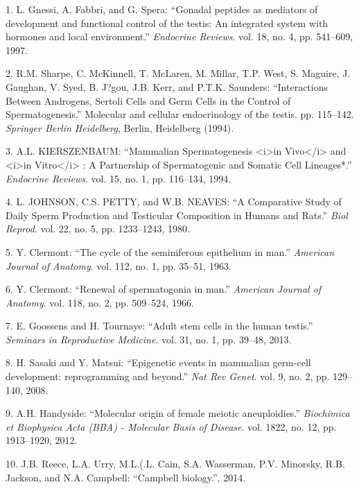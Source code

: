 \documentclass[12pt,a4paper,twoside]{ugathesis}
\theoremstyle{definition}
\theoremstyle{definition}
\theoremstyle{definition}
\theoremstyle{remark}
\begin{document}
\hypertarget{refs}{}
\hypertarget{ref-Gnessi1997}{}
1. L. Gnessi, A. Fabbri, and G. Spera: ``Gonadal peptides as mediators
of development and functional control of the testis: An integrated
system with hormones and local environment.'' \emph{Endocrine Reviews}.
vol. 18, no. 4, pp. 541--609, 1997.

\hypertarget{ref-Sharpe1994}{}
2. R.M. Sharpe, C. McKinnell, T. McLaren, M. Millar, T.P. West, S.
Maguire, J. Gaughan, V. Syed, B. J?gou, J.B. Kerr, and P.T.K. Saunders:
``Interactions Between Androgens, Sertoli Cells and Germ Cells in the
Control of Spermatogenesis.'' Molecular and cellular endocrinology of
the testis. pp. 115--142. \emph{Springer Berlin Heidelberg}, Berlin,
Heidelberg (1994).

\hypertarget{ref-KIERSZENBAUM1994}{}
3. A.L. KIERSZENBAUM: ``Mammalian Spermatogenesis
\textless{}i\textgreater{}in Vivo\textless{}/i\textgreater{} and
\textless{}i\textgreater{}in Vitro\textless{}/i\textgreater{} : A
Partnership of Spermatogenic and Somatic Cell Lineages*.''
\emph{Endocrine Reviews}. vol. 15, no. 1, pp. 116--134, 1994.

\hypertarget{ref-Johnson1980}{}
4. L. JOHNSON, C.S. PETTY, and W.B. NEAVES: ``A Comparative Study of
Daily Sperm Production and Testicular Composition in Humans and Rats.''
\emph{Biol Reprod}. vol. 22, no. 5, pp. 1233--1243, 1980.

\hypertarget{ref-Clermont1963}{}
5. Y. Clermont: ``The cycle of the seminiferous epithelium in man.''
\emph{American Journal of Anatomy}. vol. 112, no. 1, pp. 35--51, 1963.

\hypertarget{ref-Clermont1966}{}
6. Y. Clermont: ``Renewal of spermatogonia in man.'' \emph{American
Journal of Anatomy}. vol. 118, no. 2, pp. 509--524, 1966.

\hypertarget{ref-Goossens2013}{}
7. E. Goossens and H. Tournaye: ``Adult stem cells in the human
testis.'' \emph{Seminars in Reproductive Medicine}. vol. 31, no. 1, pp.
39--48, 2013.

\hypertarget{ref-Sasaki2008}{}
8. H. Sasaki and Y. Matsui: ``Epigenetic events in mammalian germ-cell
development: reprogramming and beyond.'' \emph{Nat Rev Genet}. vol. 9,
no. 2, pp. 129--140, 2008.

\hypertarget{ref-Handyside2012}{}
9. A.H. Handyside: ``Molecular origin of female meiotic aneuploidies.''
\emph{Biochimica et Biophysica Acta (BBA) - Molecular Basis of Disease}.
vol. 1822, no. 12, pp. 1913--1920, 2012.

\hypertarget{ref-Reece2014}{}
10. J.B. Reece, L.A. Urry, M.L.(.L. Cain, S.A. Wasserman, P.V. Minorsky,
R.B. Jackson, and N.A. Campbell: ``Campbell biology.'', 2014.
\end{document}
